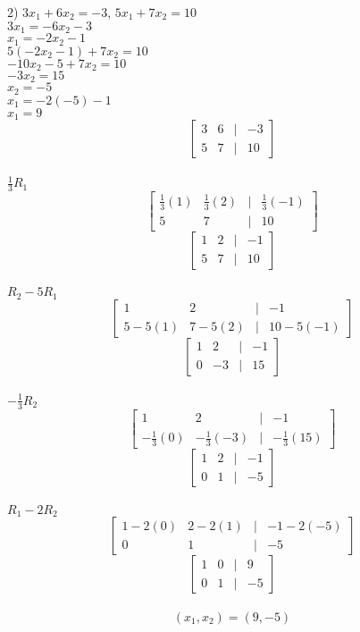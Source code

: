 \documentclass[]{article}
\begin{document}
2) $3x_1 + 6x_2 = -3$, $5x_1 + 7x_2 = 10$\\
$3x_1 = -6x_2 - 3$\\
$x_1 = -2x_2 - 1$\\
$5(-2x_2 - 1) + 7x_2 = 10$\\
$-10x_2 - 5 + 7x_2 = 10$\\
$-3x_2 = 15$\\
$x_2 = -5$\\
$x_1 = -2(-5) - 1$\\
$x_1 = 9$\\
\[
\begin{bmatrix}
	3 & 6 & | & -3 \\
	5 & 7 & | & 10
\end{bmatrix}
\]\\
$\frac{1}{3}R_1$
\[
\begin{bmatrix}
	\frac{1}{3}(1) & \frac{1}{3}(2) &|& \frac{1}{3}(-1)\\
	5&7&|&10
\end{bmatrix}
\]
\[
\begin{bmatrix}
	1&2&|&-1\\
	5&7&|&10
\end{bmatrix}
\]\\
$R_2-5R_1$
\[
\begin{bmatrix}
	1&2&|&-1\\
	5-5(1)&7-5(2)&|&10-5(-1)
\end{bmatrix}
\]
\[
\begin{bmatrix}
	1&2&|&-1\\
	0&-3&|&15
\end{bmatrix}
\]\\
$-\frac{1}{3}R_2$
\[
\begin{bmatrix}
	1&2&|&-1\\
	-\frac{1}{3}(0)&-\frac{1}{3}(-3)&|&-\frac{1}{3}(15)
\end{bmatrix}
\]
\[
\begin{bmatrix}
	1&2&|&-1\\
	0&1&|&-5
\end{bmatrix}
\]\\
$R_1-2R_2$
\[
\begin{bmatrix}
	1-2(0)&2-2(1)&|&-1-2(-5)\\
	0&1&|&-5
\end{bmatrix}
\]
\[
\begin{bmatrix}
	1&0&|&9\\
	0&1&|&-5
\end{bmatrix}
\]\\
$$(x_1, x_2) = (9,-5)$$\\
\end{document}
